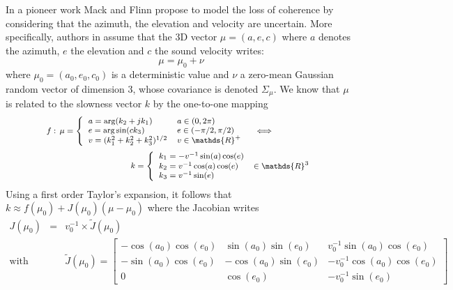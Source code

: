 In a pioneer work Mack and Flinn \cite{mack_flinn:1971} propose to model the loss of coherence by considering that the azimuth, the elevation and velocity are uncertain. More specifically, authors in \cite{nouvellet:2012}  assume that the 3D vector $\mu=(a,e,c)$ where $a$ denotes the azimuth, $e$ the elevation and $c$ the sound velocity writes:
\begin{equation}
 \label{eq:randomnesswn}
 \mu=\mu_{0}+\nu
\end{equation} 
where $\mu_{0}=(a_{0},e_{0},c_{0})$ is a deterministic value and $\nu$ a zero-mean Gaussian random vector of dimension 3, whose covariance is denoted $\Sigma_{\mu}$.  We know that $\mu$ is related to the slowness vector $k$ by the one-to-one mapping 
\begin{eqnarray*}
 \label{eq:tehtaxyz}
 {\footnotesize
 \begin{array}{rcl}
 f:\,
  \mu= 
 \left\{
 \begin{array}{ll}
 a=\arg(k_{2}+jk_{1})&a\in(0,2\pi)
 \\
 e=\arg\sin(ck_{3})&e\in(-\pi/2,\pi/2)
 \\
 v=(k_{1}^{2}+k_{2}^{2}+k_{3}^{2})^{1/2}&v\in\mathds{R}^{+}
 \end{array}\right.
 &
 \Longleftrightarrow\vspace{6pt}
 \\ 
 &&\hspace{-5.5cm}
 \,k=\left\{
 \begin{array}{ll}
 k_{1}=-v^{-1}\sin(a)\cos(e)
 \\
 k_{2}=v^{-1}\cos(a)\cos(e)&\in\mathds{R}^{3}
 \\
 k_{3}=v^{-1}\sin(e) 
 \end{array}\right.
 \end{array}}
\end{eqnarray*}
Using a first order Taylor's expansion, it follows that $k \approx f(\mu_{0})+J(\mu_{0})(\mu-\mu_{0})$ where the Jacobian writes
\begin{eqnarray*}
 J(\mu_{0}) 
&=&
v_{0}^{-1} \times \tilde J(\mu_0)
\\
\mathrm{with}&&
\tilde J(\mu_0) = 
\begin{bmatrix}
 -\cos(a_{0})\cos(e_{0})&
 \sin(a_{0})\sin(e_{0})&
 v_{0}^{-1}\sin(a_{0})\cos(e_{0})
 \\
 -\sin(a_{0})\cos(e_{0})&
 -\cos(a_{0})\sin(e_{0})&
 -v_{0}^{-1}\cos(a_{0})\cos(e_{0})
 \\
 0& 
 \cos(e_{0})&
 -v_{0}^{-1}\sin(e_{0})
 \end{bmatrix}
\end{eqnarray*}
